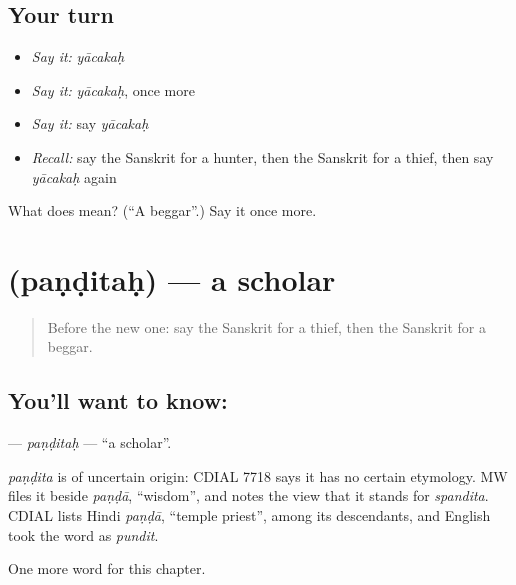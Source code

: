 \subsection*{Your turn}
\begin{itemize}
\raggedright
  \item \emph{Say it:} \emph{yācakaḥ}
  \item \emph{Say it:} \emph{yācakaḥ}, once more
  \item \emph{Say it:} say \emph{yācakaḥ}
  \item \emph{Recall:} say the Sanskrit for a hunter, then the Sanskrit for a thief, then say \emph{yācakaḥ} again
\end{itemize}

\begin{tcolorbox}[breakable,colback=teal!4,colframe=teal!35!black,title={Before you move on}]
What does  mean? (\textquotedblleft{}A beggar\textquotedblright{}.) Say it once more.
\end{tcolorbox}
\section[\texorpdfstring{\sk{पण्डितः} (paṇḍitaḥ)}{पण्डितः (paṇḍitaḥ)}]{ (paṇḍitaḥ) — a scholar}

\label{lesson:SA-C180-panditah}



\begin{quote}
Before the new one: say the Sanskrit for a thief, then the Sanskrit for a beggar.
\end{quote}

\subsection*{You'll want to know: }
\textbf{} — \emph{paṇḍitaḥ} — \textquotedblleft{}a scholar\textquotedblright{}.

\begin{cousinweb}
\emph{paṇḍita} is of uncertain origin: CDIAL 7718 says it has no certain etymology. MW files it beside \emph{paṇḍā}, \textquotedblleft{}wisdom\textquotedblright{}, and notes the view that it stands for \emph{spandita}. CDIAL lists Hindi \emph{paṇḍā}, \textquotedblleft{}temple priest\textquotedblright{}, among its descendants, and English took the word as \emph{pundit}.
\end{cousinweb}

\begin{grammarlens}[title={What you've built}]
One more word for this chapter.
\end{grammarlens}

